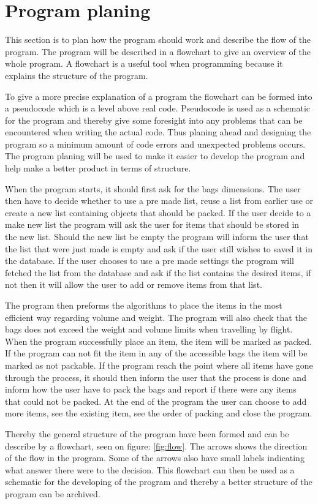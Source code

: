 \section{Program planing}
This section is to plan how the program should work and describe the flow of the program. The program will be described in a flowchart to give an overview of the whole program. A flowchart is a useful tool when programming because it explains the structure of the program.

To give a more precise explanation of a program the flowchart can be formed into a pseudocode which is a level above real code. Pseudocode is used as a schematic for the program and thereby give some foresight into any problems that can be encountered when writing the actual code. Thus planing ahead and designing the program so a minimum amount of code errors and unexpected problems occurs.
The program planing will be used to make it easier to develop the program and help make a better product in terms of structure.

When the program starts, it should first ask for the bags dimensions. The user then have to decide whether to use a pre made list, reuse a list from earlier use or create a new list containing objects that should be packed. If the user decide to a make new list the program will ask the user for items that should be stored in the new list. Should the new list be empty the program will inform the user that the list that were just made is empty and ask if the user still wishes to saved it in the database.
If the user chooses to use a pre made settings the program will fetched the list from the database and ask if the list contains the desired items, if not then it will allow the user to add or remove items from that list.

The program then preforms the algorithms to place the items in the most efficient way regarding volume and weight. The program will also check that the bags does not exceed the weight and volume limits when travelling by flight.
When the program successfully place an item, the item will be marked as packed. If the program can not fit the item in any of the accessible bags the item will be marked as not packable. If the program reach the point where all items have gone through the process, it should then inform the user that the process is done and inform how the user have to pack the bags and report if there were any items that could not be packed.
At the end of the program the user can choose to add more items, see the existing item, see the order of packing and close the program.


Thereby the general structure of the program have been formed and can be describe by a flowchart, seen on figure: \ref{fig:flow}.
The arrows shows the direction of the flow in the program. Some of the arrows also have small labels indicating what answer there were to the decision.
This flowchart can then be used as a schematic for the developing of the program and thereby a better structure of the program can be archived.